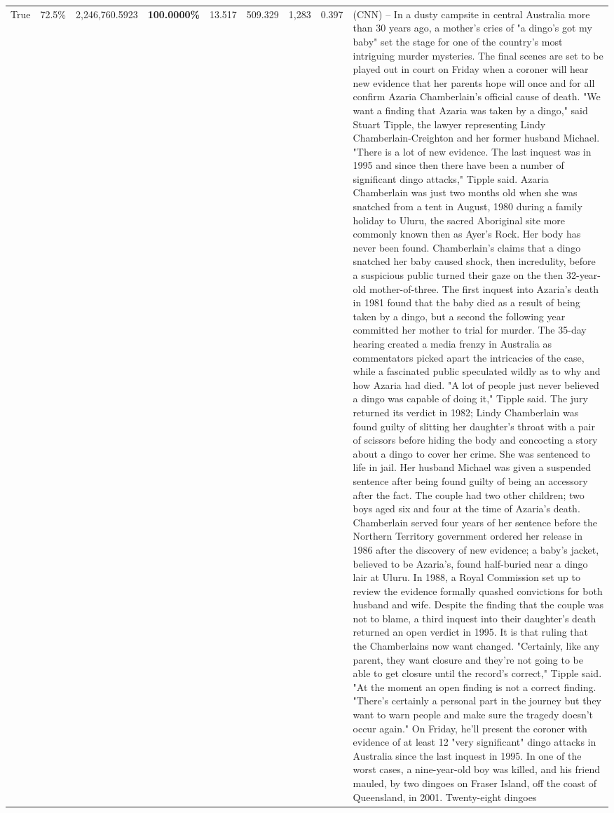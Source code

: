 \begin{table}[H]
\begin{tabular}{lllrlllll}
True & 72.5\% & 2,246,760.5923 & \bfseries \color{red} 100.0000\% & 13.517 & 509.329 & 1,283 & 0.397 & (CNN) -- In a dusty campsite in central Australia more than 30 years ago, a mother's cries of "a dingo's got my baby" set the stage for one of the country's most intriguing murder mysteries. The final scenes are set to be played out in court on Friday when a coroner will hear new evidence that her parents hope will once and for all confirm Azaria Chamberlain's official cause of death. "We want a finding that Azaria was taken by a dingo," said Stuart Tipple, the lawyer representing Lindy Chamberlain-Creighton and her former husband Michael. "There is a lot of new evidence. The last inquest was in 1995 and since then there have been a number of significant dingo attacks," Tipple said. Azaria Chamberlain was just two months old when she was snatched from a tent in August, 1980 during a family holiday to Uluru, the sacred Aboriginal site more commonly known then as Ayer's Rock. Her body has never been found. Chamberlain's claims that a dingo snatched her baby caused shock, then incredulity, before a suspicious public turned their gaze on the then 32-year-old mother-of-three. The first inquest into Azaria's death in 1981 found that the baby died as a result of being taken by a dingo, but a second the following year committed her mother to trial for murder. The 35-day hearing created a media frenzy in Australia as commentators picked apart the intricacies of the case, while a fascinated public speculated wildly as to why and how Azaria had died. "A lot of people just never believed a dingo was capable of doing it," Tipple said. The jury returned its verdict in 1982; Lindy Chamberlain was found guilty of slitting her daughter's throat with a pair of scissors before hiding the body and concocting a story about a dingo to cover her crime. She was sentenced to life in jail. Her husband Michael was given a suspended sentence after being found guilty of being an accessory after the fact. The couple had two other children; two boys aged six and four at the time of Azaria's death. Chamberlain served four years of her sentence before the Northern Territory government ordered her release in 1986 after the discovery of new evidence; a baby's jacket, believed to be Azaria's, found half-buried near a dingo lair at Uluru. In 1988, a Royal Commission set up to review the evidence formally quashed convictions for both husband and wife. Despite the finding that the couple was not to blame, a third inquest into their daughter's death returned an open verdict in 1995. It is that ruling that the Chamberlains now want changed. "Certainly, like any parent, they want closure and they're not going to be able to get closure until the record's correct," Tipple said. "At the moment an open finding is not a correct finding. "There's certainly a personal part in the journey but they want to warn people and make sure the tragedy doesn't occur again." On Friday, he'll present the coroner with evidence of at least 12 "very significant" dingo attacks in Australia since the last inquest in 1995. In one of the worst cases, a nine-year-old boy was killed, and his friend mauled, by two dingoes on Fraser Island, off the coast of Queensland, in 2001. Twenty-eight dingoes 
\end{tabular}
\end{table}
